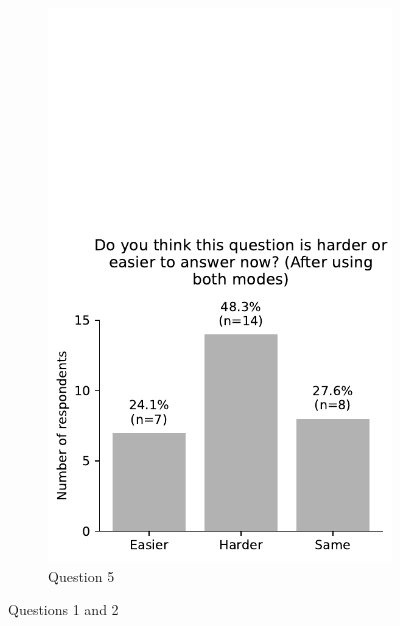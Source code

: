 \begin{figure}[H]
\begin{subfigure}[b]{0.5\textwidth}
		\includegraphics[width=\textwidth]{images/questionnaire/4.pdf}
		\caption{Question 5}
		\label{fig:Question 5}
	\end{subfigure}%
	\caption{Questions 1 and 2}
	\label{fig:Questions 4 and 5}
\end{figure}



